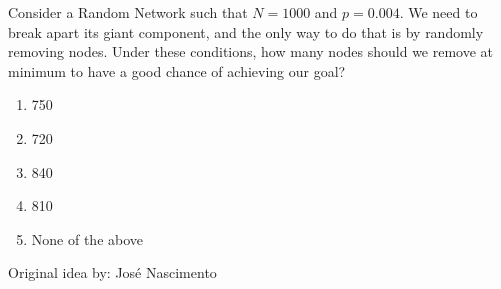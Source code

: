 
Consider a Random Network such that $N = 1000$ and $p = 0.004$. We need to break apart its giant component, and the only way to do that is by randomly removing nodes. Under these conditions, how many nodes should we remove at minimum to have a good chance of achieving our goal?

\begin{enumerate}[label={\Alph*.}]
    \item 750
    \item 720
    \item 840
    \item 810
    \item None of the above
\end{enumerate}

Original idea by: José Nascimento
